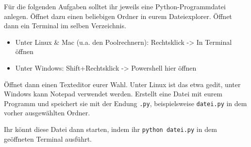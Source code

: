 Für die folgenden Aufgaben solltet ihr jeweils eine Python-Programmdatei
anlegen. Öffnet dazu einen beliebigen Ordner in eurem Dateiexplorer. Öffnet
dann ein Terminal im selben Verzeichnis.

\begin{itemize}
    \item Unter Linux \& Mac (u.a. den Poolrechnern): Rechtsklick -> In Terminal öffnen
    \item Unter Windows: Shift+Rechtsklick -> Powershell hier öffnen
\end{itemize}

Öffnet dann einen Texteditor eurer Wahl. Unter Linux ist das etwa gedit, unter
Windows kann Notepad verwendet werden. Erstellt eine Datei mit eurem Programm
und speichert sie mit der Endung \texttt{.py}, beispielsweise \texttt{datei.py}
in dem vorher ausgewählten Ordner.

Ihr könnt diese Datei dann starten, indem ihr \texttt{python datei.py} in dem geöffneten Terminal ausführt.
